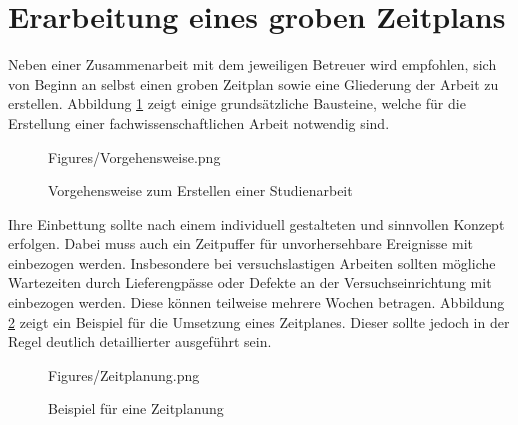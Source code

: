 \section{Erarbeitung eines groben Zeitplans}
\label{sec:Erarbeitung eines groben Zeitplans}

Neben einer Zusammenarbeit mit dem jeweiligen Betreuer wird empfohlen, sich von Beginn an selbst einen groben Zeitplan sowie eine Gliederung der Arbeit zu erstellen.
Abbildung \ref{fig:Vorgehensweise} zeigt einige grundsätzliche Bausteine, welche für die Erstellung einer fachwissenschaftlichen Arbeit notwendig sind.

\begin{figure}[H] %
	\centering
	\begin{overpic}[width=0.7\textwidth]
		{Figures/Vorgehensweise.png}
	\end{overpic}
	\caption{Vorgehensweise zum Erstellen einer Studienarbeit}
	\label{fig:Vorgehensweise}
\end{figure}

Ihre Einbettung sollte nach einem individuell gestalteten und sinnvollen Konzept erfolgen. Dabei muss auch ein Zeitpuffer für unvorhersehbare Ereignisse mit einbezogen werden. Insbesondere bei versuchslastigen Arbeiten sollten mögliche Wartezeiten durch Lieferengpässe oder Defekte an der Versuchseinrichtung mit einbezogen werden. Diese können teilweise mehrere Wochen betragen. Abbildung \ref{fig:Zeitplanung} zeigt ein Beispiel für die Umsetzung eines Zeitplanes. Dieser sollte jedoch in der Regel deutlich detaillierter ausgeführt sein.

\begin{figure}[t] %
	\centering
	\begin{overpic}[width=0.7\textwidth]
		{Figures/Zeitplanung.png}
	\end{overpic}
	\caption{Beispiel für eine Zeitplanung}
	\label{fig:Zeitplanung}
\end{figure}


